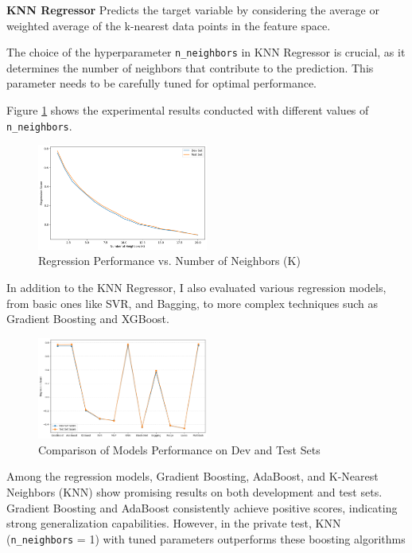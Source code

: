\documentclass[conference]{IEEEtran}
\begin{document}
\noindent \textbf{KNN Regressor} \hspace{0.2em} Predicts the target variable by considering the average or weighted average of the k-nearest data points in the feature space.

The choice of the hyperparameter \texttt{n\_neighbors} in KNN Regressor is crucial, as it determines the number of neighbors that contribute to the prediction. This parameter needs to be carefully tuned for optimal performance.

Figure \ref{fig:different_k_results} shows the experimental results conducted with different values of \texttt{n\_neighbors}.


\begin{figure}[h]
    \centering
    \includegraphics[width=0.5\textwidth]{k_regression_score.png}
    \caption{Regression Performance vs. Number of Neighbors (K)}
    \label{fig:different_k_results}
\end{figure}


In addition to the KNN Regressor, I also evaluated various regression models, from basic ones like SVR, and Bagging, to more complex techniques such as Gradient Boosting and XGBoost.


\begin{figure}[h]
    \centering
    \includegraphics[width=0.5\textwidth]{regression_score.png}
    \caption{Comparison of Models Performance on Dev and Test Sets}
    \label{fig:regression_score}
\end{figure}

Among the regression models, Gradient Boosting, AdaBoost, and K-Nearest Neighbors (KNN) show promising results on both development and test sets. Gradient Boosting and AdaBoost consistently achieve positive scores, indicating strong generalization capabilities. However, in the private test, KNN (\texttt{n\_neighbors} = 1) with tuned parameters outperforms these boosting algorithms
\end{document}
